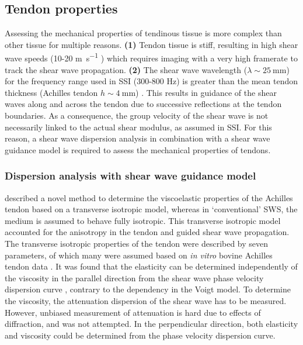 



\subsection{Tendon properties}
Assessing the mechanical properties of tendinous tissue is more complex than other tissue for multiple reasons. \textbf{(1)} Tendon tissue is stiff, resulting in high shear wave speeds (10-20 \si{\meter\per\second} \cite{cortes_continuous_2015, helfenstein-didier_vivo_2016}) which requires imaging with a very high framerate to track the shear wave propagation. \textbf{(2)} The shear wave wavelength ($\lambda {\sim}\SI{25}{\milli\meter}$) for the frequency range used in SSI (300-800 \si{\hertz}) is greater than the mean tendon thickness (Achilles tendon $h{\sim}\SI{4}{\milli\meter}$) \cite{brum_vivo_2014}. This results in guidance of the shear waves along and across the tendon due to successive reflections at the tendon boundaries. As a consequence, the group velocity of the shear wave is not necessarily linked to the actual shear modulus, as assumed in SSI. For this reason, a shear wave dispersion analysis in combination with a shear wave guidance model is required to assess the mechanical properties of tendons. 

\subsubsection{Dispersion analysis with shear wave guidance model}
\citet{brum_vivo_2014} described a novel method to determine the viscoelastic properties of the Achilles tendon based on a transverse isotropic model, whereas in `conventional' SWS, the medium is assumed to behave fully isotropic. This transverse isotropic model accounted for the anisotropy in the tendon and guided shear wave propagation. The transverse isotropic properties of the tendon were described by seven parameters, of which many were assumed based on \textit{in vitro} bovine Achilles tendon data \cite{kuo_elastic_2001}. It was found that the elasticity can be determined independently of the viscosity in the parallel direction from the shear wave phase velocity dispersion curve \cite{nguyen_assessment_2011, brum_vivo_2014}, contrary to the dependency in the Voigt model. To determine the viscosity, the attenuation dispersion of the shear wave has to be measured. However, unbiased measurement of attenuation is hard due to effects of diffraction, and was not attempted. In the perpendicular direction, both elasticity and viscosity could be determined from the phase velocity dispersion curve. 

